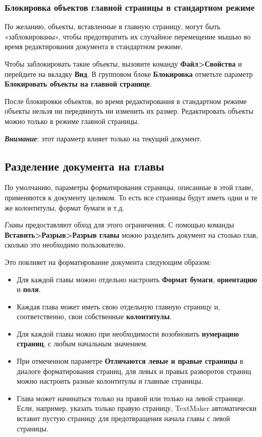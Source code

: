 ﻿\documentclass[a4paper,10pt]{article}
\begin{document}
\subsubsection{Блокировка объектов главной страницы в стандартном режиме}
По желанию, объекты, вставленные в главную страницу, могут быть «заблокированы», чтобы предотвратить их случайное перемещение мышью во время редактирования документа в стандартном режиме.  

Чтобы заблокировать такие объекты, вызовите команду \textbf{Файл>Свойства} и перейдите на вкладку \textbf{Вид}. В групповом блоке \textbf{Блокировка} отметьте параметр \textbf{Блокировать объекты на главной странице}.

После блокировки объектов, во время редактирования в стандартном режиме объекты нельзя ни передвинуть ни изменить их размер. Редактировать объекты можно только в режиме главной страницы.

\textbf{\textit{Внимание}}: этот параметр влияет только на текущий документ.

\subsection{Разделение документа на главы} \label{sec:разелдокнаглавы}
По умолчанию, параметры форматирования страницы, описанные в этой главе, применяются к документу целиком. То есть все страницы будут иметь одни и те же колонтитулы, формат бумаги и т.д.

\textit{Главы} предоставляют обход для этого ограничения. С помощью команды \textbf{Вставить>Разрыв>Разрыв главы} можно разделить документ на столько глав, сколько это необходимо пользователю. 

Это повлияет на форматирование документа следующим образом:

\begin{itemize}
 \item Для каждой главы можно отдельно настроить \textbf{Формат бумаги}, \textbf{ориентацию} и \textbf{поля}.
 \item Каждая глава может иметь свою отдельную главную страницу и, соответственно, свои собственные \textbf{колонтитулы}.
 \item Для каждой главы можно при необходимости возобновить \textbf{нумерацию страниц}, с любым начальным значением.
 \item При отмеченном параметре \textbf{Отличаются левые и правые страницы} в диалоге форматирования страниц, для левых и правых разворотов страниц можно настроить разные колонтитулы и главные страницы.
 \item Глава может начинаться только на правой или только на левой странице. Если, например, указать только правую страницу, TextMaker автоматически вставит пустую страницу для предотвращения начала главы с левой страницы.
\end{itemize}
\end{document}
